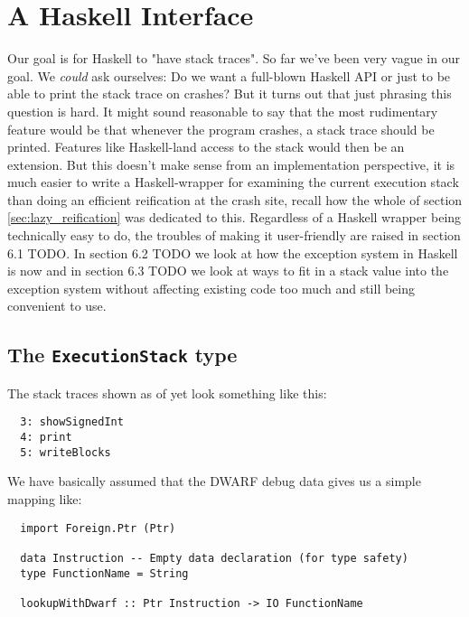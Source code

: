 \chapter{A Haskell Interface}

Our goal is for Haskell to "have stack traces". So far we've been
very vague in our goal. We \emph{could} ask ourselves: Do we want a
full-blown Haskell API or just to be able to print the stack trace on
crashes? %
But it turns out that just phrasing this question is hard.
It might sound reasonable to say that the most rudimentary feature
would be that whenever the program crashes, a stack trace should be
printed. Features like Haskell-land access to the stack would then
be an extension. But this doesn't make sense from an implementation
perspective, it is much easier to write a Haskell-wrapper for examining
the current execution stack than doing an efficient reification at the
crash site, recall how the whole of section \ref{sec:lazy_reification}
was dedicated to this. Regardless of a Haskell wrapper being technically
easy to do,
the troubles of making it user-friendly are 
raised in section 6.1 TODO. In section
6.2 TODO we look at how the exception system in Haskell is now and
in section 6.3 TODO we look at ways to fit in a stack value into the
exception system without affecting existing code too much and still
being convenient to use.


\section{The \texttt{ExecutionStack} type}

The stack traces shown as of yet look something like this:

\begin{verbatim}
  3: showSignedInt
  4: print
  5: writeBlocks
\end{verbatim}

We have basically assumed that the DWARF debug data gives us a simple
mapping like:

\begin{verbatim}
  import Foreign.Ptr (Ptr)

  data Instruction -- Empty data declaration (for type safety)
  type FunctionName = String

  lookupWithDwarf :: Ptr Instruction -> IO FunctionName
\end{verbatim}

